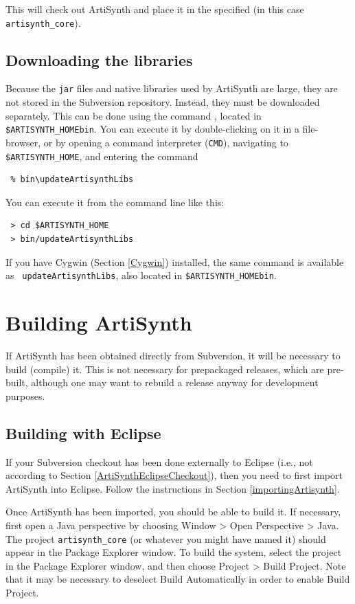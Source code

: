 This will check out ArtiSynth and place it in the specified \directory 
(in this case {\tt artisynth\_core}).
\fi

\subsection{Downloading the libraries}
\label{DownloadingLibraries}

Because the {\tt jar} files and native libraries used by ArtiSynth
are large, they are not stored in the Subversion repository.
Instead, they must be downloaded separately. This can be
done using the command \updateArtisynthLibs, located
in {\tt \$ARTISYNTH\_HOME\SEP bin}.
\ifWindows
You can execute it by double-clicking on it in a file-browser, or
by opening a command interpreter ({\tt CMD}), navigating
to {\tt \$ARTISYNTH\_HOME}, and entering the command
\begin{verbatim}
 % bin\updateArtisynthLibs
\end{verbatim}
\else
You can execute it from the command line like this:
\begin{verbatim}
 > cd $ARTISYNTH_HOME
 > bin/updateArtisynthLibs
\end{verbatim}
\fi

\ifWindows
If you have Cygwin (Section \ref{Cygwin}) installed, 
the same command is available as {\tt
updateArtisynthLibs}, also located in {\tt \$ARTISYNTH\_HOME\SEP bin}.
\else\fi

\section{Building ArtiSynth}
\label{Building}

If ArtiSynth has been obtained directly from Subversion, it will be
necessary to build (compile) it. This is not necessary for prepackaged
releases, which are pre-built, although one may want to rebuild a
release anyway for development purposes.

\subsection{Building with Eclipse}
\label{BuildingWithEclipse}

If your Subversion checkout has been done externally to Eclipse (i.e.,
not according to Section \ref{ArtiSynthEclipseCheckout}), then you
need to first import ArtiSynth into Eclipse. Follow the instructions
in Section \ref{importingArtisynth}.

Once ArtiSynth has been imported, you should be able to build it.  If
necessary, first open a Java perspective by choosing {\sf Window >
Open Perspective > Java}. The project {\tt artisynth\_core} (or
whatever you might have named it) should appear in the {\sf Package
Explorer} window. To build the system, select the project in the {\sf
Package Explorer} window, and then choose {\sf Project > Build
Project}. Note that it may be necessary to deselect {\sf Build
Automatically} in order to enable {\sf Build Project}.

